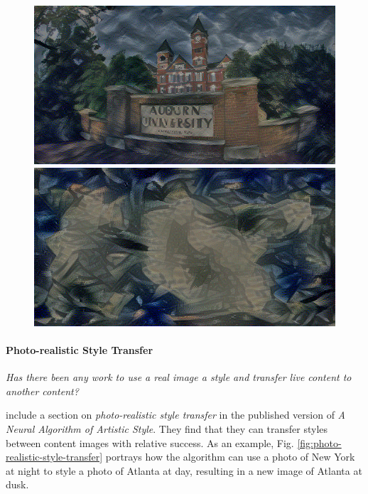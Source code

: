 \documentclass{article}
\begin{document}
\begin{figure}[htp]
\medskip

    \begin{minipage}{0.3\linewidth}
    \includegraphics[width=\textwidth]{img/content-layer-selection/block4_conv1}
    \end{minipage}
    \begin{minipage}{0.3\linewidth}
    \includegraphics[width=\textwidth]{img/content-layer-selection/block5_conv1}
    \end{minipage}

\end{figure}


\paragraph{Photo-realistic Style Transfer} \textit{Has there been any work to
use a real image a style and transfer live content to another content?}

\cite{gatys2016image} include a section on \textit{photo-realistic style
transfer} in the published version of \textit{A Neural Algorithm of Artistic
Style}. They find that they can transfer styles between content images with
relative success. As an example, Fig. \ref{fig:photo-realistic-style-transfer}
portrays how the algorithm can use a photo of New York at night to style a
photo of Atlanta at day, resulting in a new image of Atlanta at dusk.
\end{document}
